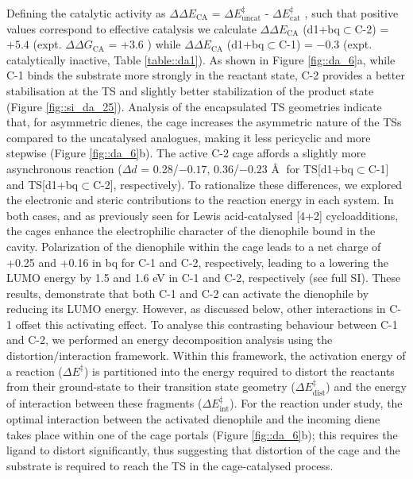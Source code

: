 \documentclass[../../main.tex]{subfiles}
\begin{document}
Defining the catalytic activity as $\Delta\Delta E_\text{CA}$ = $\Delta E_\text{uncat}^\ddagger$ - $\Delta E_\text{cat}^\ddagger$ , such that positive values correspond to effective catalysis we calculate $\Delta\Delta E_\text{CA}$ (d1+bq$\subset$C-2) = $+5.4$ \kcalx (expt. $\Delta\Delta G_\text{CA}$  = +3.6 \kcalx) while $\Delta\Delta E_\text{CA}$ (d1+bq$\subset$C-1) = $-0.3$ \kcalx (expt. catalytically inactive, Table \ref{table::da1}). As shown in Figure \ref{fig::da_6}a, while C-1 binds the substrate more strongly in the reactant state, C-2 provides a better stabilisation at the TS and slightly better stabilization of the product state (Figure \ref{fig::si_da_25}). Analysis of the encapsulated TS geometries indicate that, for asymmetric dienes, the cage increases the asymmetric nature of the TSs compared to the uncatalysed analogues, making it less pericyclic and more stepwise (Figure \ref{fig::da_6}b). The active C-2 cage affords a slightly more asynchronous reaction ($\Delta d$ = 0.28/$-0.17$, 0.36/$-0.23$ \AA$\;$ for TS[d1+bq$\subset$C-1] and TS[d1+bq$\subset$C-2], respectively). 
To rationalize these differences, we explored the electronic and steric contributions to the reaction energy in each system. In both cases, and as previously seen for Lewis acid-catalysed [4+2] cycloadditions,\cite{Fringuelli2002, Corey2002, Liu2015} the cages enhance the electrophilic character of the dienophile bound in the cavity. Polarization of the dienophile within the cage leads to a net charge of +0.25 and +0.16 in bq for C-1 and C-2, respectively,\cite{MartCentellesDuarte2018} leading to a lowering the LUMO energy by 1.5 and 1.6 eV in C-1 and C-2, respectively (see full SI). These results, demonstrate that both C-1 and C-2 can activate the dienophile by reducing its LUMO energy. However, as discussed below, other interactions in C-1 offset this activating effect. To analyse this contrasting behaviour between C-1 and C-2, we performed an energy decomposition analysis using the distortion/interaction framework.\cite{Ess2007} Within this framework, the activation energy of a reaction ($\Delta E^\ddagger$) is partitioned into the energy required to distort the reactants from their ground-state to their transition state geometry ($\Delta E^\ddagger_\text{dist}$) and the energy of interaction between these fragments ($\Delta E^\ddagger_\text{int}$). For the reaction under study, the optimal interaction between the activated dienophile and the incoming diene takes place within one of the cage portals (Figure \ref{fig::da_6}b); this requires the ligand to distort significantly, thus suggesting that distortion of the cage and the substrate is required to reach the TS in the cage-catalysed process.
\end{document}
